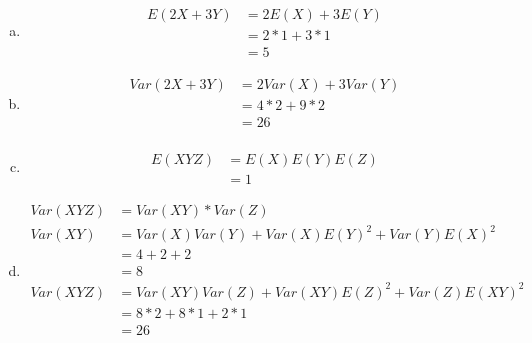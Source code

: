 \documentclass[10pt]{report}
\begin{document}
  \subsection{}
 \begin{enumerate}[(a)]
 \item \begin{align*}
 E(2X + 3Y) &= 2E(X) + 3E(Y) \\
 &= 2*1 + 3*1  \\
 &= 5
 \end{align*}
 \item \begin{align*}
 Var(2X + 3Y) &= 2Var(X) + 3Var(Y) \\
 &= 4*2 + 9*2\\
 &= 26 \\
 \end{align*}
 \item \begin{align*}
 E(XYZ) &= E(X)E(Y)E(Z) \\
 &= 1
 \end{align*}
 \item \begin{align*}
 Var(XYZ) &= Var(XY) * Var(Z) \\
 Var(XY) &= Var(X)Var(Y) + Var(X)E(Y)^2 + Var(Y)E(X)^2\\
 &= 4 + 2 + 2  \\
 &= 8 \\
 Var(XYZ) &= Var(XY)Var(Z) + Var(XY)E(Z)^2 + Var(Z)E(XY)^2 \\
 &= 8*2 + 8*1 + 2 * 1 \\
 &= 26 \\
 \end{align*}
 \end{enumerate}
    \setcounter{subsection}{7}
\end{document}
